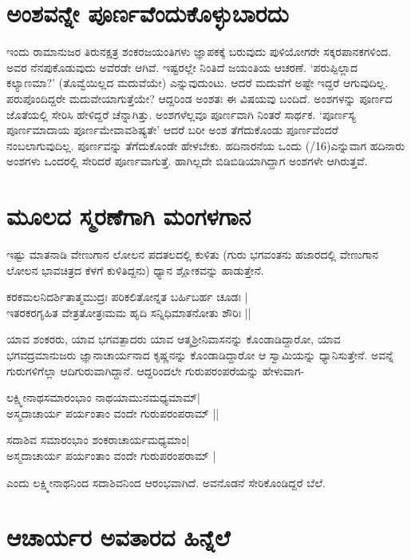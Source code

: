 \section*{ಅಂಶವನ್ನೇ ಪೂರ್ಣವೆಂದುಕೊಳ್ಳುಬಾರದು}

ಇಂದು ರಾಮಾನುಜರ ತಿರುನಕ್ಷತ್ರ ಶಂಕರಜಯಂತಿಗಳು ಜ್ಞಾಪಕಕ್ಕೆ ಬರುವುದು ಪುಳಿಯೋಗರೇ ಸಕ್ಕರಪಾನಕಗಳಿಂದ. ಅವರ ನೆನಪುಕೊಡುವುದು ಅವೆರಡೇ ಆಗಿವೆ. ಇಷ್ಟರಲ್ಲೇ ನಿಂತಿದೆ ಜಯಂತಿಯ ಆಚರಣೆ. `ಪರುಪ್ಪಿಲ್ಲಾದ ಕಲ್ಯಾಣಮಾ?' (ತೊವ್ವೆಯಿಲ್ಲದ ಮದುವೆಯೇ) ಎನ್ನುವುದುಂಟು. ಆದರೆ ಮದುವೆಗೆ ಅಷ್ಟೇ ಇದ್ದರೆ ಆಗುವುದಿಲ್ಲ. ಪರುಪೊಂದಿದ್ದರೇ ಮದುವೇಯಾಗುತ್ತೆಯೇ? ಆದ್ದರಿಂಡ ಅಂಶತಃ ಈ ವಿಷಯವು ಬಂದಿದೆ. ಅಂಶಗಳನ್ನು  ಪೂರ್ಣದ ಜೊತೆಯಲ್ಲಿ ಸೇರಿಸಿ ಹೇಳಿದ್ದರೆ ಚೆನ್ನಾಗಿತ್ತು. ಅಂಶಗಳೆಲ್ಲವೂ ಪೂರ್ಣವಾಗಿ ನಿಂತರೆ ಸಾರ್ಥಕ. `ಪೂರ್ಣಸ್ಯ ಪೂರ್ಣಮಾದಾಯ ಪೂರ್ಣಮೇವಾವಶಿಷ್ಯತೇ' ಆದರೆ ಬರೀ ಅಂಶ ತೆಗೆದುಕೊಂಡು ಪೂರ್ಣವೆಂದರೆ ನಂಬಲಾಗುವುದಿಲ್ಲ. ಪೂರ್ಣವನ್ನು ತೆಗೆದುಕೊಂಡೇ ಹೇಳಬೇಕು. ಹದಿನಾರನೆಯ ಒಂದು {(/16)}ಎನ್ನುವಾಗ ಹದಿನಾರು ಅಂಶಗಳು ಒಂದರಲ್ಲಿ ಸೇರಿದರೆ ಪೂರ್ಣವಾಗುತ್ತೆ. ಹಾಗಿಲ್ಲದೇ ಬಿಡಿಬಿಡಿಯಾಗಿದ್ದಾಗ ಅಂಶಗಳೇ ಆಗಿರುತ್ತವೆ.

\section*{ಮೂಲದ ಸ್ಮರಣೆಗಾಗಿ ಮಂಗಳಗಾನ}

ಇಷ್ಟು ಮಾತನಾಡಿ ವೇಣುಗಾನ ಲೋಲನ ಪದತಲದಲ್ಲಿ ಕುಳಿತು (ಗುರು ಭಗವಂತನು ಹಜಾರದಲ್ಲಿ ವೇಣುಗಾನ ಲೋಲನ ಭಾವಚಿತ್ರದ ಕೆಳಗೆ ಕುಳಿತಿದ್ದನು) ಧ್ಯಾನ ಶ್ಲೋಕವನ್ನು ಹಾಡುತ್ತೇನೆ.

\begin{shloka}
ಕರಕಮಲನಿದರ್ಶಿತಾತ್ಮಮುದ್ರಃ ಪರಿಕಲಿತೋನ್ನತ ಬರ್ಹಿಬರ್ಹ ಚೂಡಃ |\\%
ಇತರಕರಗೃಹಿತ ವೇತ್ರತೋತ್ರಃಮಮ ಹೃದಿ ಸನ್ನಿಧಿಮಾತನೋತು ಶೌರಿಃ ||
\end{shloka}

ಯಾವ ಶಂಕರರು, ಯಾವ ಭಗವತ್ಪಾದರು ಯಾವ ಆತ್ಮಶ್ರೀನಿವಾಸನನ್ನು ಕೊಂಡಾಡಿದ್ದಾರೋ, ಯಾವ ಭಗವದ್ರಮಾನುಜರು ಜ್ಞಾನಾಚಾರ್ಯನಾದ ಕೃಷ್ಣನನ್ನು ಕೊಂಡಾಡಿದ್ದಾರೋ ಆ ಸ್ವಾಮಿಯನ್ನು ಧ್ಯಾನಿಸುತ್ತೇನೆ. ಅವನ್ನೆ ಗುರುಗಳಿಗೆಲ್ಲಾ ಆದಿಗುರುವಾಗಿದ್ದಾನೆ. ಆದ್ದರಿಂದಲೇ ಗುರುಪರಂಪರೆಯನ್ನು ಹೇಳುವಾಗ-

\begin{shloka}
ಲಕ್ಷ್ಮೀನಾಥಸಮಾರಂಭಾಂ ನಾಥಯಾಮುನಮಧ್ಯಮಾಮ್|\\
ಅಸ್ಮದಾಚಾರ್ಯ ಪರ್ಯಂತಾಂ ವಂದೇ ಗುರುಪರಂಪರಾಮ್ ||
\end{shloka}

\begin{shloka}
ಸದಾಶಿವ ಸಮಾರಂಭಾಂ ಶಂಕರಾಚಾರ್ಯಮಧ್ಯಮಾಂ|\\
ಅಸ್ಮದಾಚಾರ್ಯ ಪರ್ಯಂತಾಂ ವಂದೇ ಗುರುಪರಂಪರಾಮ್ |
\end{shloka}
ಎಂದು ಲಕ್ಷ್ಮೀನಾಥನಿಂದ ಸದಾಶಿವನಿಂದ ಆರಂಭವಾಗಿದೆ. ಅವನೊಡನೆ ಸೇರಿಕೊಂಡಿದ್ದರೆ ಬೆಲೆ.

\section*{ಆಚಾರ್ಯರ ಅವತಾರದ ಹಿನ್ನೆಲೆ}

